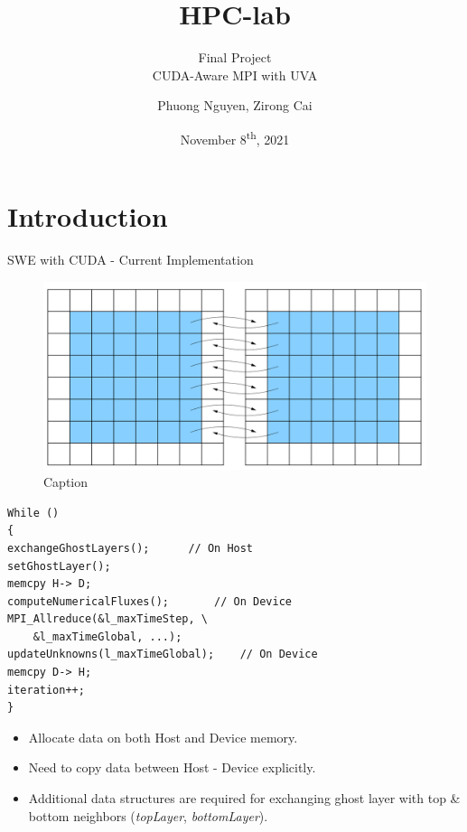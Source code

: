 \documentclass[
  english,            %
  aspectratio=169,    %
  11pt
]{tumbeamer}
\title{HPC-lab }
\subtitle{Final Project\\
	 CUDA-Aware MPI with UVA}
\author{Phuong Nguyen, Zirong Cai}
\institute{\theChairName\\\theDepartmentName\\\theUniversityName}
\date[8/11/2021]{November 8\textsuperscript{th}, 2021}
\begin{document}
\maketitle

\section{Introduction}

\begin{frame}[fragile]{SWE with CUDA - Current Implementation}
	\begin{minipage}[t]{0.4\textwidth}
		\begin{figure}
			\centering
			\includegraphics[width=\textwidth,keepaspectratio=true]{figs/2dgrid.png}
			\caption{Caption}
			\label{fig:my_label}
		\end{figure}
	\end{minipage}
	\begin{minipage}[t]{0.04\textwidth}
	\end{minipage}
	\begin{minipage}[t]{0.52\textwidth}
		\tiny
		\begin{lstlisting}[frame=single]
While () 
{
exchangeGhostLayers(); 		// On Host
setGhostLayer(); 
memcpy H-> D;
computeNumericalFluxes();		// On Device
MPI_Allreduce(&l_maxTimeStep, \
	&l_maxTimeGlobal, ...);
updateUnknowns(l_maxTimeGlobal);	// On Device
memcpy D-> H;
iteration++;
}
		\end{lstlisting}
	\end{minipage}
	\begin{itemize}
		\item Allocate data on both Host and Device memory.
		\item Need to copy data between Host - Device explicitly. 
		\item Additional data structures are required for exchanging ghost layer with top \& bottom neighbors (\textit{topLayer}, \textit{bottomLayer}).
	\end{itemize}
	
\end{frame}
\end{document}
